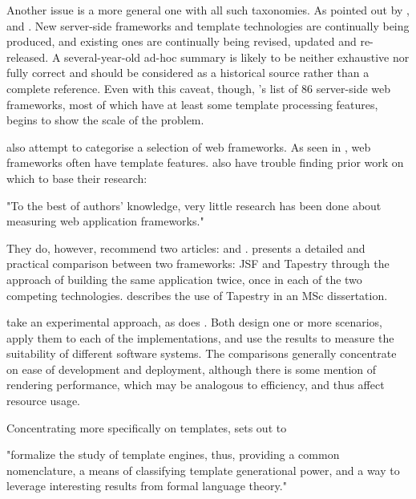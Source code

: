 Another issue is a more general one with all such taxonomies. As pointed out by \cite{Usman2017} , and . New server-side frameworks and template technologies are continually being produced, and existing ones are continually being revised, updated and re-released. A several-year-old ad-hoc summary is likely to be neither exhaustive nor fully correct and should be considered as a historical source rather than a complete reference. Even with this caveat, though, \citeauthor{Vosloo2008}'s list of 86 server-side web frameworks, most of which have at least some template processing features, begins to show the scale of the problem.

\cite{Laakso2008} also attempt to categorise a selection of web frameworks. As seen in \cite{Vosloo2008}, web frameworks often have template features. \citeauthor{Laakso2008} also have trouble finding prior work on which to base their research:

\begin{displayquote}
"To the best of authors' knowledge, very little research has been done about measuring web application frameworks." \citep{Laakso2008}
\end{displayquote}

They do, however, recommend two articles: \cite{Zoio2005} and \cite{Kolesnikov2006}. \citeauthor{Zoio2005} presents a detailed and practical comparison between two frameworks: JSF \citep{Oracle2005JSF} and Tapestry \citep{Apache2018Tapestry} through the approach of building the same application twice, once in each of the two competing technologies. \citeauthor{Kolesnikov2006} describes the use of Tapestry in an MSc dissertation.

\citeauthor{Laakso2008} take an experimental approach, as does \citeauthor{Zoio2005}. Both design one or more scenarios, apply them to each of the implementations, and use the results to measure the suitability of different software systems. The comparisons generally concentrate on ease of development and deployment, although there is some mention of rendering performance, which may be analogous to efficiency, and thus affect resource usage. 

Concentrating more specifically on templates, \cite{Parr2004} sets out to 

\begin{displayquote}
"formalize the study of template engines, thus, providing a common nomenclature, a means of classifying template generational power, and a way to leverage interesting results from formal language theory." \citep{Parr2004}
\end{displayquote}


